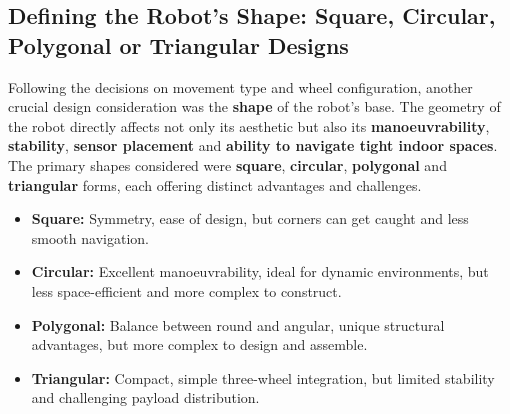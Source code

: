 \subsection{Defining the Robot’s Shape: Square, Circular, Polygonal or Triangular Designs}

Following the decisions on movement type and wheel configuration, another crucial design consideration was the \textbf{shape} of the robot's base. The geometry of the robot directly affects not only its aesthetic but also its \textbf{manoeuvrability}, \textbf{stability}, \textbf{sensor placement} and \textbf{ability to navigate tight indoor spaces}. The primary shapes considered were \textbf{square}, \textbf{circular}, \textbf{polygonal} and \textbf{triangular} forms, each offering distinct advantages and challenges.

\begin{itemize}
    \item \textbf{Square:} Symmetry, ease of design, but corners can get caught and less smooth navigation.
    \item \textbf{Circular:} Excellent manoeuvrability, ideal for dynamic environments, but less space-efficient and more complex to construct.
    \item \textbf{Polygonal:} Balance between round and angular, unique structural advantages, but more complex to design and assemble.
    \item \textbf{Triangular:} Compact, simple three-wheel integration, but limited stability and challenging payload distribution.
\end{itemize}
